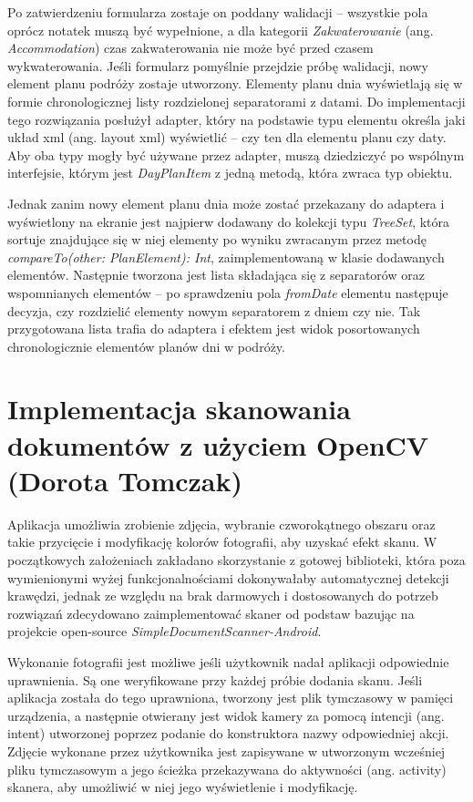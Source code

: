 \par Po zatwierdzeniu formularza zostaje on poddany walidacji – wszystkie pola oprócz notatek muszą być wypełnione, a dla kategorii \textit{Zakwaterowanie} (ang. \textit{Accommodation}) czas zakwaterowania nie może być przed czasem wykwaterowania. Jeśli formularz pomyślnie przejdzie próbę walidacji, nowy element planu podróży zostaje utworzony.
Elementy planu dnia wyświetlają się w formie chronologicznej listy rozdzielonej separatorami z datami. Do implementacji tego rozwiązania posłużył adapter, który na podstawie typu elementu określa jaki układ xml (ang. layout xml) wyświetlić – czy ten dla elementu planu czy daty. Aby oba typy mogły być używane przez adapter, muszą dziedziczyć po wspólnym interfejsie, którym jest \textit{DayPlanItem} z jedną metodą, która zwraca typ obiektu.
\par Jednak zanim nowy element planu dnia może zostać przekazany do adaptera i wyświetlony na ekranie jest najpierw dodawany do kolekcji typu \textit{TreeSet}, która sortuje znajdujące się w niej elementy po wyniku zwracanym przez metodę \textit{compareTo(other: PlanElement): Int}, zaimplementowaną w klasie dodawanych elementów. Następnie tworzona jest lista składająca się z separatorów oraz wspomnianych elementów – po sprawdzeniu pola \textit{fromDate} elementu następuje decyzja, czy rozdzielić elementy nowym separatorem z dniem czy nie. Tak przygotowana lista trafia do adaptera i efektem jest widok posortowanych chronologicznie elementów planów dni w podróży.


\section{Implementacja skanowania dokumentów z użyciem OpenCV (Dorota Tomczak)}
\par Aplikacja umożliwia zrobienie zdjęcia, wybranie czworokątnego obszaru oraz takie przycięcie i modyfikację kolorów fotografii, aby uzyskać efekt skanu. W początkowych założeniach zakładano skorzystanie z gotowej biblioteki, która poza wymienionymi wyżej funkcjonalnościami dokonywałaby automatycznej detekcji krawędzi, jednak ze względu na brak darmowych i dostosowanych do potrzeb rozwiązań zdecydowano zaimplementować skaner od podstaw bazując na projekcie open-source \newline \textit{SimpleDocumentScanner-Android}\cite{SimpleDocumentScanner-Android}.

\par Wykonanie fotografii jest możliwe jeśli użytkownik nadał aplikacji odpowiednie uprawnienia. Są one weryfikowane przy każdej próbie dodania skanu. Jeśli aplikacja została do tego uprawniona, tworzony jest plik tymczasowy w pamięci urządzenia, a następnie otwierany jest widok kamery za pomocą intencji (ang. intent) utworzonej poprzez podanie do konstruktora nazwy odpowiedniej akcji. Zdjęcie wykonane przez użytkownika jest zapisywane w utworzonym wcześniej pliku tymczasowym a jego ścieżka przekazywana do aktywności (ang. activity) skanera, aby umożliwić w niej jego wyświetlenie i modyfikację.

